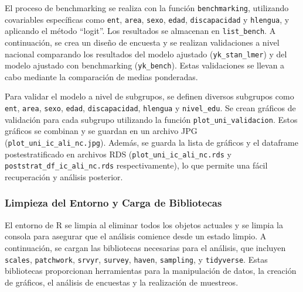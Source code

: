 \documentclass[
  12pt,
]{book}
\begin{document}
El proceso de benchmarking se realiza con la función \texttt{benchmarking}, utilizando covariables específicas como \texttt{ent}, \texttt{area}, \texttt{sexo}, \texttt{edad}, \texttt{discapacidad} y \texttt{hlengua}, y aplicando el método ``logit''. Los resultados se almacenan en \texttt{list\_bench}. A continuación, se crea un diseño de encuesta y se realizan validaciones a nivel nacional comparando los resultados del modelo ajustado (\texttt{yk\_stan\_lmer}) y del modelo ajustado con benchmarking (\texttt{yk\_bench}). Estas validaciones se llevan a cabo mediante la comparación de medias ponderadas.

Para validar el modelo a nivel de subgrupos, se definen diversos subgrupos como \texttt{ent}, \texttt{area}, \texttt{sexo}, \texttt{edad}, \texttt{discapacidad}, \texttt{hlengua} y \texttt{nivel\_edu}. Se crean gráficos de validación para cada subgrupo utilizando la función \texttt{plot\_uni\_validacion}. Estos gráficos se combinan y se guardan en un archivo JPG (\texttt{plot\_uni\_ic\_ali\_nc.jpg}). Además, se guarda la lista de gráficos y el dataframe postestratificado en archivos RDS (\texttt{plot\_uni\_ic\_ali\_nc.rds} y \texttt{poststrat\_df\_ic\_ali\_nc.rds} respectivamente), lo que permite una fácil recuperación y análisis posterior.

\hypertarget{limpieza-del-entorno-y-carga-de-bibliotecas-7}{%
\subsubsection*{Limpieza del Entorno y Carga de Bibliotecas}\label{limpieza-del-entorno-y-carga-de-bibliotecas-7}}

El entorno de R se limpia al eliminar todos los objetos actuales y se limpia la consola para asegurar que el análisis comience desde un estado limpio. A continuación, se cargan las bibliotecas necesarias para el análisis, que incluyen \texttt{scales}, \texttt{patchwork}, \texttt{srvyr}, \texttt{survey}, \texttt{haven}, \texttt{sampling}, y \texttt{tidyverse}. Estas bibliotecas proporcionan herramientas para la manipulación de datos, la creación de gráficos, el análisis de encuestas y la realización de muestreos.
\end{document}
